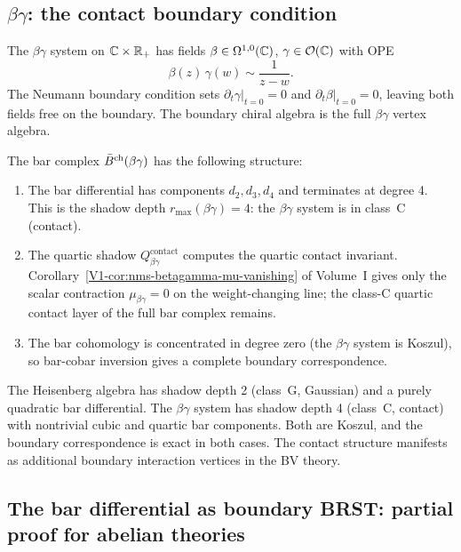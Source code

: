 \subsection{\texorpdfstring{$\beta\gamma$}{Betagamma}: the contact boundary condition}

\begin{construction}
The $\beta\gamma$ system on $\mathbb{C} \times \mathbb{R}_+$ has fields
$\beta \in \Omega^{1,0}(\mathbb{C})$, $\gamma \in \mathcal{O}(\mathbb{C})$ with OPE
\[
\beta(z) \, \gamma(w) \sim \frac{1}{z - w}.
\]
The Neumann boundary condition sets $\partial_t \gamma|_{t=0} = 0$ and
$\partial_t \beta|_{t=0} = 0$, leaving both fields free on the boundary.
The boundary chiral algebra is the full $\beta\gamma$ vertex algebra.

The bar complex $\bar{B}^{\mathrm{ch}}(\beta\gamma)$ has the following structure:
\begin{enumerate}
\item The bar differential has components $d_2, d_3, d_4$ and terminates
 at degree 4. This is the shadow depth $r_{\max}(\beta\gamma) = 4$:
 the $\beta\gamma$ system is in class~C (contact).
\item The quartic shadow $Q^{\mathrm{contact}}_{\beta\gamma}$ computes
 the quartic contact invariant. Corollary~\ref*{V1-cor:nms-betagamma-mu-vanishing}
 of Volume~I gives only the scalar contraction
 $\mu_{\beta\gamma}=0$ on the weight-changing line; the class-C
 quartic contact layer of the full bar complex remains.
\item The bar cohomology is concentrated in degree zero (the $\beta\gamma$
 system is Koszul), so bar-cobar inversion gives a complete boundary
 correspondence.
\end{enumerate}
\end{construction}

\begin{remark}
The Heisenberg algebra has shadow depth 2 (class~G, Gaussian) and a
purely quadratic bar differential. The $\beta\gamma$ system has shadow
depth 4 (class~C, contact) with nontrivial cubic
and quartic bar components. Both are
Koszul, and the boundary correspondence is exact in both cases. The
contact structure manifests as additional
boundary interaction vertices in the BV theory.
\end{remark}

\subsection{The bar differential as boundary BRST: partial proof for abelian theories}

